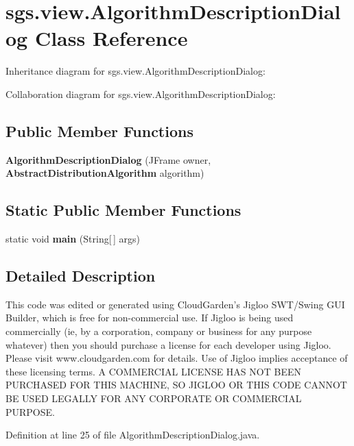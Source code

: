 \section{sgs.\-view.\-Algorithm\-Description\-Dialog Class Reference}
\label{classsgs_1_1view_1_1_algorithm_description_dialog}


Inheritance diagram for sgs.\-view.\-Algorithm\-Description\-Dialog\-:


Collaboration diagram for sgs.\-view.\-Algorithm\-Description\-Dialog\-:
\subsection*{Public Member Functions}
\begin{DoxyCompactItemize}
\item 
{\bf Algorithm\-Description\-Dialog} (J\-Frame owner, {\bf Abstract\-Distribution\-Algorithm} algorithm)
\end{DoxyCompactItemize}
\subsection*{Static Public Member Functions}
\begin{DoxyCompactItemize}
\item 
static void {\bf main} (String[$\,$] args)
\end{DoxyCompactItemize}


\subsection{Detailed Description}
This code was edited or generated using Cloud\-Garden's Jigloo S\-W\-T/\-Swing G\-U\-I Builder, which is free for non-\/commercial use. If Jigloo is being used commercially (ie, by a corporation, company or business for any purpose whatever) then you should purchase a license for each developer using Jigloo. Please visit www.\-cloudgarden.\-com for details. Use of Jigloo implies acceptance of these licensing terms. A C\-O\-M\-M\-E\-R\-C\-I\-A\-L L\-I\-C\-E\-N\-S\-E H\-A\-S N\-O\-T B\-E\-E\-N P\-U\-R\-C\-H\-A\-S\-E\-D F\-O\-R T\-H\-I\-S M\-A\-C\-H\-I\-N\-E, S\-O J\-I\-G\-L\-O\-O O\-R T\-H\-I\-S C\-O\-D\-E C\-A\-N\-N\-O\-T B\-E U\-S\-E\-D L\-E\-G\-A\-L\-L\-Y F\-O\-R A\-N\-Y C\-O\-R\-P\-O\-R\-A\-T\-E O\-R C\-O\-M\-M\-E\-R\-C\-I\-A\-L P\-U\-R\-P\-O\-S\-E. 

Definition at line 25 of file Algorithm\-Description\-Dialog.\-java.



